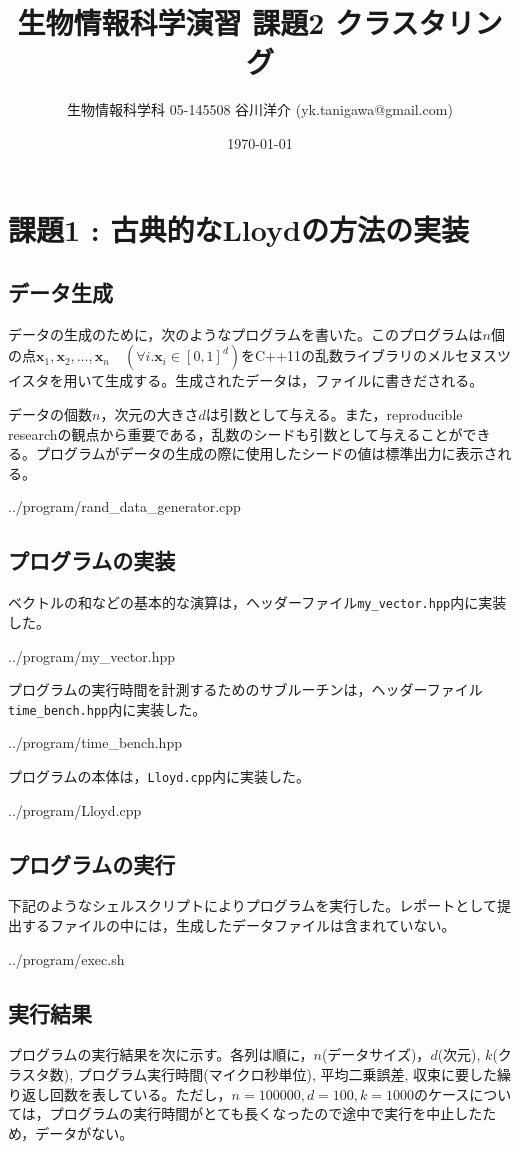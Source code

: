 \documentclass[10pt,a4,uplatex]{jsarticle}
\title{生物情報科学演習 課題2 クラスタリング}
\author{生物情報科学科 05-145508 谷川洋介 (yk.tanigawa@gmail.com)}
\date{\today}
\begin{document}
\maketitle

\section{課題1 : 古典的なLloydの方法の実装}
\subsection{データ生成}
データの生成のために，次のようなプログラムを書いた。このプログラムは$n$個の点$\bm{x}_1, \bm{x}_2, \ldots, \bm{x}_n\quad(\forall{}i. \bm{x}_i\in[0,1]^d)$をC++11の乱数ライブラリのメルセヌスツイスタを用いて生成する。生成されたデータは，ファイルに書きだされる。

データの個数$n$，次元の大きさ$d$は引数として与える。また，reproducible researchの観点から重要である，乱数のシードも引数として与えることができる。プログラムがデータの生成の際に使用したシードの値は標準出力に表示される。

{../program/rand_data_generator.cpp}

\subsection{プログラムの実装}
ベクトルの和などの基本的な演算は，ヘッダーファイル\verb+my_vector.hpp+内に実装した。

{../program/my_vector.hpp}

プログラムの実行時間を計測するためのサブルーチンは，ヘッダーファイル\verb+time_bench.hpp+内に実装した。

{../program/time_bench.hpp}

プログラムの本体は，\verb+Lloyd.cpp+内に実装した。

{../program/Lloyd.cpp}


\subsection{プログラムの実行}
下記のようなシェルスクリプトによりプログラムを実行した。レポートとして提出するファイルの中には，生成したデータファイルは含まれていない。

{../program/exec.sh}

\subsection{実行結果}
プログラムの実行結果を次に示す。各列は順に，$n$(データサイズ)，$d$(次元), $k$(クラスタ数), プログラム実行時間(マイクロ秒単位), 平均二乗誤差, 収束に要した繰り返し回数を表している。ただし，$n = 100000, d = 100, k = 1000$のケースについては，プログラムの実行時間がとても長くなったので途中で実行を中止したため，データがない。
\end{document}
